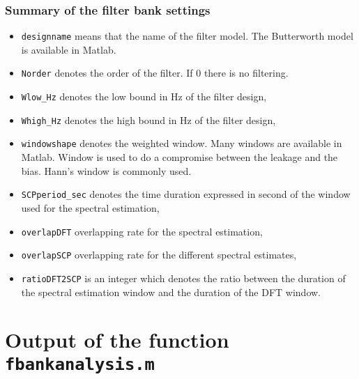 \subsubsection{Summary of the filter bank settings}

\label{sss:filter-bank-settings}

\begin{center}
{\small}
\end{center}

\begin{itemize}
\item
{\tt designname} means that the name of the filter model. The Butterworth model is available in Matlab. 
\item
{\tt Norder} denotes the order of the filter. If 0 there is no filtering. 
\item
{\tt Wlow\_Hz} denotes the low bound in Hz of the filter design,
\item
{\tt Whigh\_Hz} denotes the high bound in Hz of the filter design,
\item
{\tt windowshape} denotes the weighted window. Many windows are available in Matlab. Window is used to do a compromise between the leakage and the bias. Hann's window is commonly used.
\item
{\tt SCPperiod\_sec} denotes the time duration expressed in second of the window used for the spectral estimation,
\item
{\tt overlapDFT} overlapping rate for the spectral estimation,
\item
{\tt overlapSCP} overlapping rate for the different spectral estimates,
\item
{\tt ratioDFT2SCP} is an integer which denotes the ratio between the duration of the spectral estimation window and the duration of the DFT window. 

\end{itemize}


\section{Output of the function {\tt fbankanalysis.m}}

